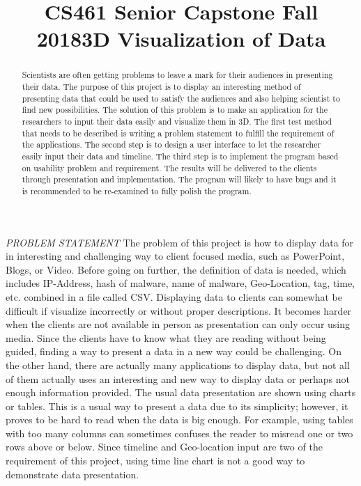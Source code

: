 \documentclass[letter, 10pt, titlepage, onecolumn, draftclsnofoot]{IEEEtran}
\author{\name}
\title{CS461 Senior Capstone Fall 2018\newline 3D Visualization of Data}
\begin{document}
\maketitle
\hrulefill

\begin{abstract}
\noindent Scientists are often getting problems to leave a mark for their audiences in presenting their data. The purpose of this project is to display an interesting method of presenting data that could be used to satisfy the audiences and also helping scientist to find new possibilities. The solution of this problem is to make an application for the researchers to input their data easily and visualize them in 3D. The first test method that needs to be described is writing a problem statement to fulfill the requirement of the applications. The second step is to design a user interface to let the researcher easily input their data and timeline. The third step is to implement the program based on usability problem and requirement. The results will be delivered to the clients through presentation and implementation. The program will likely to have bugs and it is recommended to be re-examined to fully polish the program.
\end{abstract}

\emph{PROBLEM STATEMENT}
\newline 
The problem of this project is how to display data for in interesting and challenging way to client focused media, such as PowerPoint, Blogs, or Video. Before going on further, the definition of data is needed, which includes IP-Address, hash of malware, name of malware, Geo-Location, tag, time, etc. combined in a file called CSV. Displaying data to clients can somewhat be difficult if visualize incorrectly or without proper descriptions. It becomes harder when the clients are not available in person as presentation can only occur using media. Since the clients have to know what they are reading without being guided, finding a way to present a data in a new way could be challenging. 
\newline 
On the other hand, there are actually many applications to display data, but not all of them actually uses an interesting and new way to display data or perhaps not enough information provided. The usual data presentation are shown using charts or tables. This is a usual way to present a data due to its simplicity; however, it proves to be hard to read when the data is big enough. For example, using tables with too many columns can sometimes confuses the reader to misread one or two rows above or below. Since timeline and Geo-location input are two of the requirement of this project, using time line chart is not a good way to demonstrate data presentation. 
\end{document}
